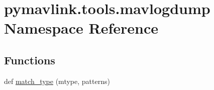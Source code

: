 \hypertarget{namespacepymavlink_1_1tools_1_1mavlogdump}{}\section{pymavlink.\+tools.\+mavlogdump Namespace Reference}
\label{namespacepymavlink_1_1tools_1_1mavlogdump}
\subsection*{Functions}
\begin{DoxyCompactItemize}
\item 
def \hyperlink{namespacepymavlink_1_1tools_1_1mavlogdump_a6d6e4b627922cd7882784716f7f8db1f}{match\+\_\+type} (mtype, patterns)
\end{DoxyCompactItemize}
